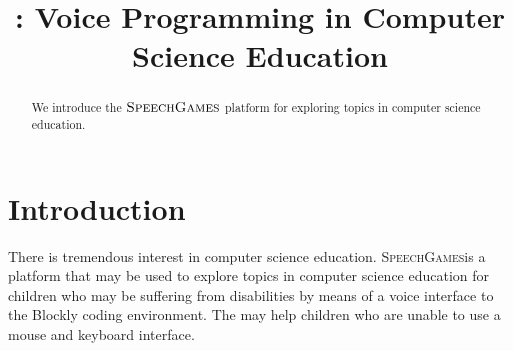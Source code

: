 \documentclass[]{article}
\title{\sg: Voice Programming in Computer Science Education}
\def\sg{\textsc{SpeechGames}}
\begin{document}
\maketitle

\begin{abstract}
  We introduce the $\sg$ platform for exploring topics in computer science
  education.
\end{abstract}

\section{Introduction}


There is tremendous interest in computer science education.
\sg is a platform
that may be used to explore topics in computer science education for children
who may be suffering from disabilities by means of a voice interface to the
Blockly coding environment. The may help children who are unable to use a mouse
and keyboard interface.


\end{document}
